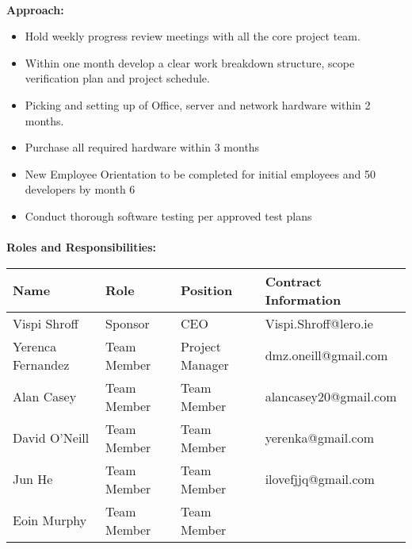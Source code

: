 		\paragraph{}
			\vspace{5mm}
			\textbf{Approach:} 
			\newline
			\begin{itemize}
			\item Hold weekly progress review meetings with all the core project team.
			\item Within one month develop a clear work breakdown structure, scope verification plan and project schedule.
			\item Picking and setting up of Office, server and network hardware within 2 months.
			\item Purchase all required hardware within 3 months
			\item New Employee Orientation to be completed for initial employees and 50 developers by month 6
			\item Conduct thorough software testing per approved test plans
			\end{itemize}
			
			\paragraph{}
				\vspace{10mm}
				\textbf{Roles and Responsibilities:} 
				\newline

				\begin{tabular}{ | >{\scriptsize}p{35mm} | >{\scriptsize}p{25mm} | >{\scriptsize}p{25mm} | >{\scriptsize}p{40mm} | }
					\hline

					\textbf{Name} 			& \textbf{Role} 	& \textbf{Position} 	& \textbf{Contract Information}  	\\ \hline
					Vispi Shroff	 		& Sponsor 			& CEO 					& Vispi.Shroff@lero.ie 				\\ \hline
					\rowcolor[gray]{.98}
					Yerenca Fernandez	 	& Team Member 		& Project Manager	 	& dmz.oneill@gmail.com 				\\ \hline
					Alan Casey		 		& Team Member 		& Team Member			& alancasey20@gmail.com 			\\ \hline
					\rowcolor[gray]{.98}
					David O'Neill	 		& Team Member 		& Team Member		 	& yerenka@gmail.com 				\\ \hline
					Jun He	 				& Team Member 		& Team Member		 	& ilovefjjq@gmail.com 				\\ \hline
					\rowcolor[gray]{.98}
					Eoin Murphy	 			& Team Member 		& Team Member 			&  							\\ \hline

				\end{tabular}